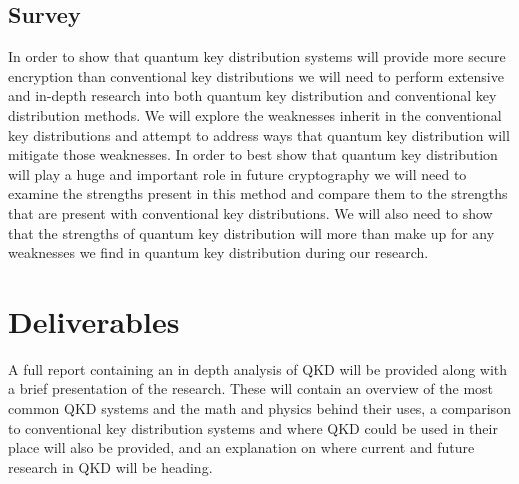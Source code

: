 \documentclass[conference]{IEEEtran}
\begin{document}
\subsection{Survey}
In order to show that quantum key distribution systems will provide more secure encryption than conventional key distributions we will need to perform extensive and in-depth research into both quantum key distribution and conventional key distribution methods. We will explore the weaknesses inherit in the conventional key distributions and attempt to address ways that quantum key distribution will mitigate those weaknesses. In order to best show that quantum key distribution will play a huge and important role in future cryptography we will need to examine the strengths present in this method and compare them to the strengths that are present with conventional key distributions. We will also need to show that the strengths of quantum key distribution will more than make up for any weaknesses we find in quantum key distribution during our research.\\

\section{Deliverables}
A full report containing an in depth analysis of QKD will be provided along with a brief presentation of the research. These will contain an overview of the most common QKD systems and the math and physics behind their uses, a comparison to conventional key distribution systems and where QKD could be used in their place will also be provided, and an explanation on where current and future research in QKD will be heading.\\


%
%
\end{document}
